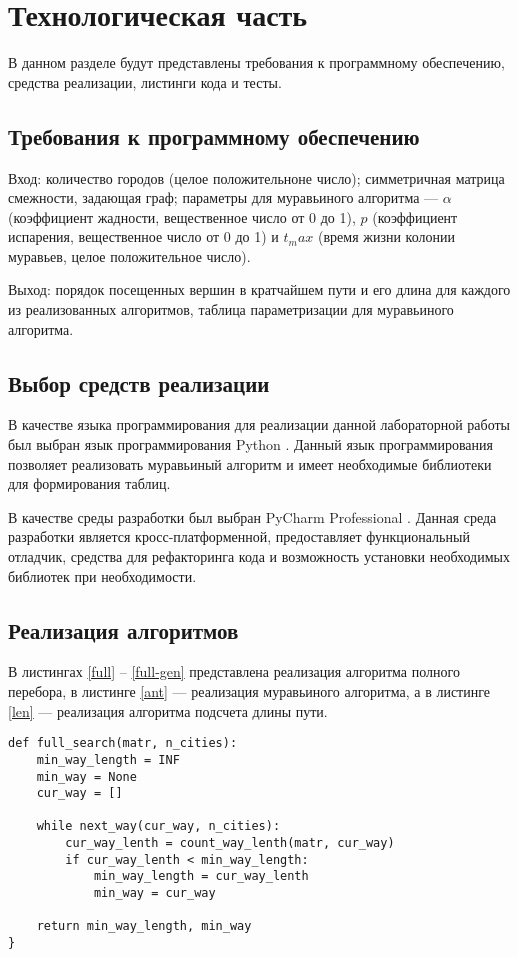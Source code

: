 \chapter{Технологическая часть}
В данном разделе будут представлены требования к программному обеспечению, средства реализации, листинги кода и тесты.

\section{Требования к программному обеспечению}

Вход: количество городов (целое положительноне число); симметричная матрица смежности, задающая граф; параметры для муравьиного алгоритма --- $\alpha$ (коэффициент жадности, вещественное число от 0 до 1), $p$ (коэффициент испарения, вещественное число от 0 до 1) и $t_max$ (время жизни колонии муравьев, целое положительное число).

Выход: порядок посещенных вершин в кратчайшем пути и его длина для каждого из реализованных алгоритмов, таблица параметризации для муравьиного алгоритма.

\section{Выбор средств реализации}

В качестве языка программирования для реализации данной лабораторной работы был выбран язык программирования Python  \cite{PythonBook}. Данный язык программирования позволяет реализовать муравьиный алгоритм и имеет необходимые библиотеки для формирования таблиц.

В качестве среды разработки был выбран PyCharm Professional \cite{pycharm}. Данная среда разработки является кросс-платформенной, предоставляет функциональный отладчик, средства для рефакторинга кода и возможность установки необходимых библиотек при необходимости.

\section{Реализация алгоритмов}
В листингах \ref{full} -- \ref{full-gen} представлена реализация алгоритма полного перебора,
в листинге \ref{ant} --- реализация муравьиного алгоритма, а в листинге \ref{len} --- реализация алгоритма подсчета длины пути.

\captionsetup{singlelinecheck = false, justification=raggedright}
\begin{lstlisting}[caption=Реализация алгоритма полного перебора, 
    label={full}]
def full_search(matr, n_cities):
    min_way_length = INF
    min_way = None
    cur_way = []

    while next_way(cur_way, n_cities):
        cur_way_lenth = count_way_lenth(matr, cur_way)
        if cur_way_lenth < min_way_length:
            min_way_length = cur_way_lenth
            min_way = cur_way

    return min_way_length, min_way
}
\end{lstlisting}

